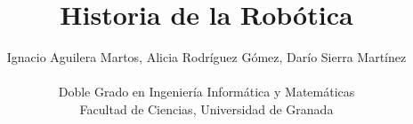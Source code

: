 \documentclass[a4paper,10pt]{article}
\begin{document}
	
\title{\textbf{Historia de la Robótica}}
\date{}
\author{Ignacio Aguilera Martos, Alicia Rodríguez Gómez, Darío Sierra Martínez\\ \\
	\small Doble Grado en Ingeniería Informática y Matemáticas\\
	\small Facultad de Ciencias, Universidad de Granada
} 
	
\maketitle

\begin{abstract}

\end{abstract}


\normalsize

% 
	
\onecolumn
\begin{thebibliography}{11}
	
	
\end{thebibliography}	
	
	
\end{document}
